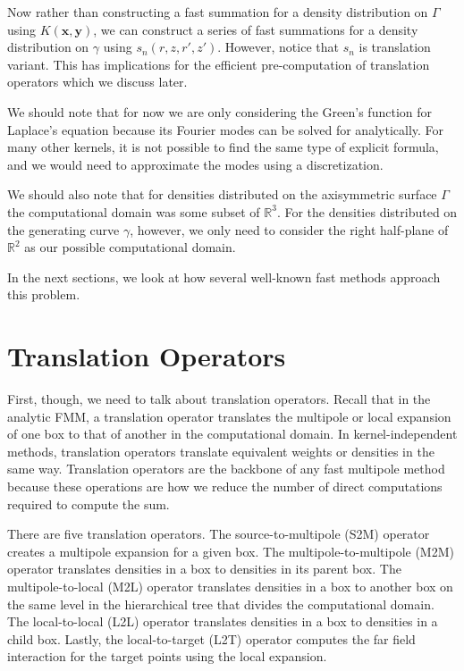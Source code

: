 \documentclass[11pt, oneside]{article}   	%
\begin{document}
Now rather than constructing a fast summation for a density distribution on $\Gamma$ using $K(\mathbf{x},\mathbf{y})$, we can construct a series of fast summations for a density distribution on $\gamma$ using $s_n(r,z,r',z')$. However, notice that $s_n$ is translation variant. This has implications for the efficient pre-computation of translation operators which we discuss later.

We should note that for now we are only considering the Green's function for Laplace's equation because its Fourier modes can be solved for analytically. For many other kernels, it is not possible to find the same type of explicit formula, and we would need to approximate the modes using a discretization.

We should also note that for densities distributed on the axisymmetric surface $\Gamma$ the computational domain was some subset of $\mathbb{R}^3$. For the densities distributed on the generating curve $\gamma$, however, we only need to consider the right half-plane of $\mathbb{R}^2$ as our possible computational domain.

In the next sections, we look at how several well-known fast methods approach this problem.

\section{Translation Operators}
First, though, we need to talk about translation operators. Recall that in the analytic FMM, a translation operator translates the multipole or local expansion of one box to that of another in the computational domain. In kernel-independent methods, translation operators translate equivalent weights or densities in the same way. Translation operators are the backbone of any fast multipole method because these operations are how we reduce the number of direct computations required to compute the sum.

There are five translation operators. The source-to-multipole (S2M) operator creates a multipole expansion for a given box. The multipole-to-multipole (M2M) operator translates densities in a box to densities in its parent box. The multipole-to-local (M2L) operator translates densities in a box to another box on the same level in the hierarchical tree that divides the computational domain. The local-to-local (L2L) operator translates densities in a box to densities in a child box. Lastly, the local-to-target (L2T) operator computes the far field interaction for the target points using the local expansion.
\end{document}
